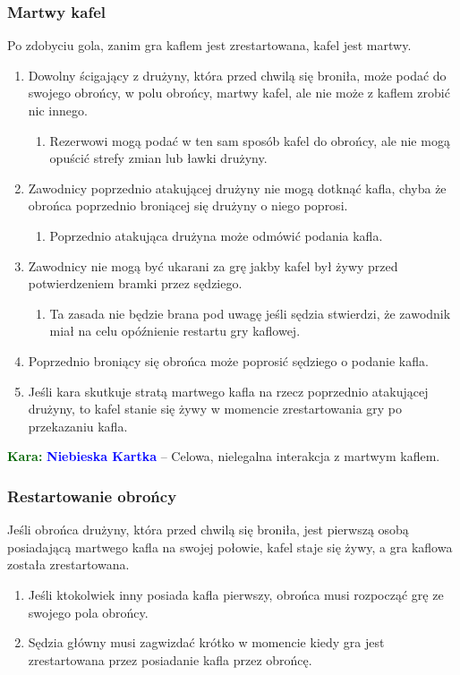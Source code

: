 \documentclass[11pt,a4paper]{article}
\newcommand\bluecard[1]{\bgroup\textcolor{darkgreen}{\textbf{Kara: }}\bgroup\textcolor{blue}{\textbf{Niebieska Kartka}} -- #1}
\begin{document}
\subsubsection{Martwy kafel}
Po zdobyciu gola, zanim gra kaflem jest zrestartowana, kafel jest martwy.
\begin{enumerate}
  \item Dowolny ścigający z drużyny, która przed chwilą się broniła, może podać do swojego obrońcy, w polu obrońcy, martwy kafel, ale nie może z kaflem zrobić nic innego.
  \begin{enumerate}
    \item Rezerwowi mogą podać w ten sam sposób kafel do obrońcy, ale nie mogą opuścić strefy zmian lub ławki drużyny.
  \end{enumerate}
  \item Zawodnicy poprzednio atakującej drużyny nie mogą dotknąć kafla, chyba że obrońca poprzednio broniącej się drużyny o niego poprosi.
  \begin{enumerate}
    \item Poprzednio atakująca drużyna może odmówić podania kafla.
  \end{enumerate}
  \item Zawodnicy nie mogą być ukarani za grę jakby kafel był żywy przed potwierdzeniem bramki przez sędziego.
  \begin{enumerate}
    \item Ta zasada nie będzie brana pod uwagę jeśli sędzia stwierdzi, że zawodnik miał na celu opóźnienie restartu gry kaflowej.
  \end{enumerate}
  \item Poprzednio broniący się obrońca może poprosić sędziego o podanie kafla.
  \item Jeśli kara skutkuje stratą martwego kafla na rzecz poprzednio atakującej drużyny, to kafel stanie się żywy w momencie zrestartowania gry po przekazaniu kafla.
\end{enumerate}

\bluecard{Celowa, nielegalna interakcja z martwym kaflem.}

\subsubsection{Restartowanie obrońcy}
Jeśli obrońca drużyny, która przed chwilą się broniła, jest pierwszą osobą posiadającą martwego kafla na swojej połowie, kafel staje się żywy, a gra kaflowa została zrestartowana.
\begin{enumerate}
  \item Jeśli ktokolwiek inny posiada kafla pierwszy, obrońca musi rozpocząć grę ze swojego pola obrońcy.
  \item Sędzia główny musi zagwizdać krótko w momencie kiedy gra jest zrestartowana przez posiadanie kafla przez obrońcę.
\end{enumerate}
\end{document}
